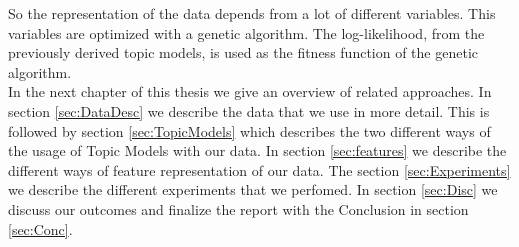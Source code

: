 \documentclass[11pt,a4paper]{article}
\begin{document}
So the representation of the data depends from a lot of different variables. This variables are optimized with a genetic algorithm. The log-likelihood, from the previously derived topic models, is used as the fitness function of the genetic algorithm.\\

In the next chapter of this thesis we give an overview of related approaches. In section \ref{sec:DataDesc} we describe the data that we use in more detail. This is followed by section \ref{sec:TopicModels} which describes the two different ways of the usage of Topic Models with our data. In section \ref{sec:features} we describe the different ways of feature representation of our data. The section \ref{sec:Experiments} we describe the different experiments that we perfomed. In section \ref{sec:Disc} we discuss our outcomes and finalize the report with the Conclusion in section \ref{sec:Conc}.


% 
% 
% 
\pagebreak
\end{document}
